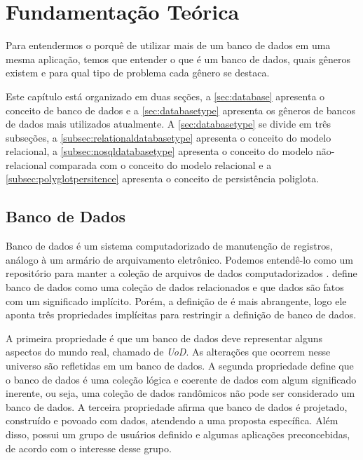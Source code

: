 \chapter{Fundamentação Teórica}
\label{chap:fundamentacaoTeorica}


Para entendermos o porquê de utilizar mais de um banco de dados em uma mesma aplicação, temos que entender o que é um banco de dados, quais gêneros existem e para qual tipo de problema cada gênero se destaca.

Este capítulo está organizado em duas seções, a \autoref{sec:database} apresenta o conceito de banco de dados e a \autoref{sec:databasetype} apresenta os gêneros de bancos de dados mais utilizados atualmente. A \autoref{sec:databasetype} se divide em três subseções, a \autoref{subsec:relationaldatabasetype} apresenta o conceito do modelo relacional, a \autoref{subsec:nosqldatabasetype} apresenta o conceito do modelo não-relacional comparada com o conceito do modelo relacional e a \autoref{subsec:polyglotpersitence} apresenta o conceito de persistência poliglota.

\section{Banco de Dados}
\label{sec:database}

Banco de dados é um sistema computadorizado de manutenção de registros, análogo à um armário de arquivamento eletrônico. Podemos entendê-lo como um repositório para manter a coleção de arquivos de dados computadorizados \cite{CJDate}.  define banco de dados como uma coleção de dados relacionados e que dados são fatos com um significado implícito. Porém, a definição de  é mais abrangente, logo ele aponta três propriedades implícitas para restringir a definição de banco de dados.

A primeira propriedade é que um banco de dados deve representar alguns aspectos do mundo real, chamado de \textit{\ac{UoD}}. As alterações que ocorrem nesse universo são refletidas em um banco de dados. A segunda propriedade define que o banco de dados é uma coleção lógica e coerente de dados com algum significado inerente, ou seja, uma coleção de dados randômicos não pode ser considerado um banco de dados. A terceira propriedade afirma que banco de dados é projetado, construído e povoado com dados, atendendo a uma proposta específica. Além disso, possui um grupo de usuários definido e algumas aplicações preconcebidas, de acordo com o interesse desse grupo.

